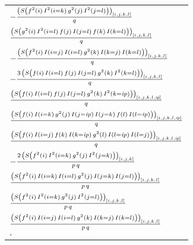 \documentclass[12pt]{article}
\begin{document}
\begin{longtable}{l}
\\
$-{{\left(S\left(f^2\left(i\right)\,I^2\left(i=k\right)\,g^2\left(j
 \right)\,I^2\left(j=l\right)\right)\right)_{\left[ i , j , k , l
  \right] }}\over{q}}$
\\
${{\left(S\left(g^2\left(i\right)\,I^2\left(i=l\right)\,f\left(j
 \right)\,I\left(j=l\right)\,f\left(k\right)\,I\left(k=l\right)
 \right)\right)_{\left[ i , j , k , l \right] }}\over{q}}$
\\
$-{{\left(S\left(f^2\left(i\right)\,I\left(i=j\right)\,I\left(i=l
 \right)\,g^2\left(k\right)\,I\left(k=j\right)\,I\left(k=l\right)
 \right)\right)_{\left[ i , j , k , l \right] }}\over{q}}$
\\
$-{{3\,\left(S\left(f\left(i\right)\,I\left(i=l\right)\,f\left(j
 \right)\,I\left(j=l\right)\,g^2\left(k\right)\,I^2\left(k=l\right)
 \right)\right)_{\left[ i , j , k , l \right] }}\over{q}}$
\\
${{\left(S\left(f\left(i\right)\,I\left(i=l\right)\,f\left(j\right)
 \,I\left(j=l\right)\,g^2\left(k\right)\,I^2\left(k={\it ip}\right)
 \right)\right)_{\left[ i , j , k , l , {\it ip} \right] }}\over{q}}$
\\
${{\left(S\left(f\left(i\right)\,I\left(i=k\right)\,g^2\left(j
 \right)\,I\left(j={\it ip}\right)\,I\left(j=k\right)\,f\left(l
 \right)\,I\left(l={\it ip}\right)\right)\right)_{\left[ i , j , k ,
 l , {\it ip} \right] }}\over{q}}$
\\
${{\left(S\left(f\left(i\right)\,I\left(i=j\right)\,f\left(k\right)
 \,I\left(k={\it ip}\right)\,g^2\left(l\right)\,I\left(l={\it ip}
 \right)\,I\left(l=j\right)\right)\right)_{\left[ i , j , k , l ,
 {\it ip} \right] }}\over{q}}$
\\
$-{{2\,\left(S\left(f^2\left(i\right)\,I^2\left(i=k\right)\,g^2
 \left(j\right)\,I^2\left(j=k\right)\right)\right)_{\left[ i , j , k
  \right] }}\over{p\,q}}$
\\
${{\left(S\left(f^2\left(i\right)\,I\left(i=k\right)\,I\left(i=l
 \right)\,g^2\left(j\right)\,I\left(j=k\right)\,I\left(j=l\right)
 \right)\right)_{\left[ i , j , k , l \right] }}\over{p\,q}}$
\\
${{\left(S\left(f^2\left(i\right)\,I^2\left(i=k\right)\,g^2\left(j
 \right)\,I^2\left(j=l\right)\right)\right)_{\left[ i , j , k , l
  \right] }}\over{p\,q}}$
\\
${{\left(S\left(f^2\left(i\right)\,I\left(i=j\right)\,I\left(i=l
 \right)\,g^2\left(k\right)\,I\left(k=j\right)\,I\left(k=l\right)
 \right)\right)_{\left[ i , j , k , l \right] }}\over{p\,q}}$
\\
$\cdot$
\end{longtable}
\end{document}
